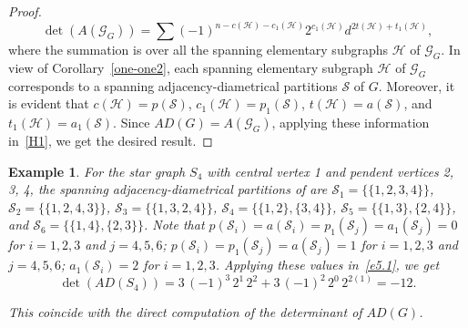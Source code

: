 \documentclass[12pt]{article}
\numberwithin{equation}{section}
\newtheorem{example}{Example}[section]
\begin{document}
\begin{proof}
		\begin{equation}\label{H1}
			\det (A(\mathcal{G}_G)) = \sum (-1)^{n-c(\mathcal{H})-c_1(\mathcal{H})} 2^{c_{1}(\mathcal{H})} d^{2 t(\mathcal{H})+t_1(\mathcal{H})},
		\end{equation}
		where the summation is over all the spanning elementary  subgraphs $\mathcal{H}$ of $\mathcal{G}_G$. In view of Corollary~\ref{one-one2},  each spanning elementary  subgraph $\mathcal{H}$ of $\mathcal{G}_G$ corresponds to a spanning adjacency-diametrical partitions $\mathcal S$ of $G$. Moreover, it is evident that $c(\mathcal{H})=p(\mathcal S)$, $c_1(\mathcal{H})=p_1(\mathcal S)$, $t(\mathcal{H})=a(\mathcal S)$, and $t_1(\mathcal{H})=a_1(\mathcal S)$. Since $AD(G) =A(\mathcal{G}_G)$, applying these information in~\eqref{H1}, we get the desired result.
		\end{proof}
	
	
	\begin{example}\normalfont
		 For the star graph $S_4$ with central vertex 1 and pendent vertices  2, 3, 4, the spanning adjacency-diametrical partitions of    are $\mathcal S_1=\{\{1, 2, 3, 4\}\}$, $\mathcal S_2=\{\{1,2,4,3\}\}$, $\mathcal S_3=\{\{1,3,2,4\}\}$, $ \mathcal S_4=\{\{1,2\}, \{3,4\}\}$, $\mathcal S_5=\{\{1,3\},\{2,4\}\}$, and $\mathcal S_6=\{\{1,4\},\{2,3\}\}$.		
		Note that		
		$p(\mathcal S_i)=a(\mathcal S_i)=p_1(\mathcal S_j)=a_1(\mathcal S_j)=0$ for $i=1,2,3$ and $j=4,5,6$;		
		$p(\mathcal S_i)=p_1(\mathcal S_j)=a(\mathcal S_j)=1$ for $i=1,2,3$ and $j=4,5,6$;		
		$a_1(\mathcal S_i)=2$ for $i=1,2,3$.		
		Applying these values in~\eqref{e5.1}, we get
		\[\det(AD(S_4))= 3\,(-1)^3\,2^1\,2^2 + 3\,(-1)^2\,2^0\,2^{2(1)}=-12.\]
		
		\noindent This coincide with the direct computation of the determinant of $AD(G)$.
	\end{example} 
	
\end{document}
